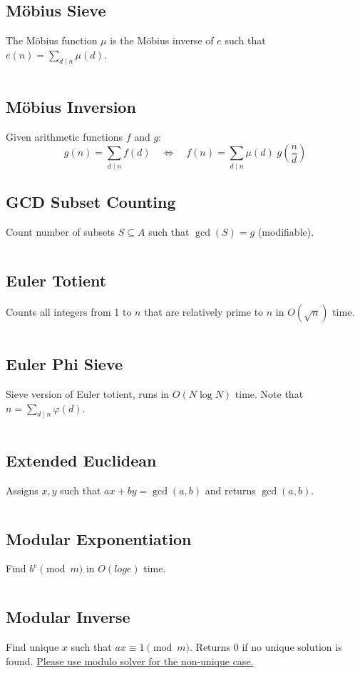\documentclass[8pt,a4paper,landscape,oneside]{amsart}
\newcommand{\code}[1]{\inputminted[fontsize=\normalsize,baselinestretch=1]{cpp}{_code/#1}}
\begin{document}
\begin{multicols*}{3}
  \subsection{M\"{o}bius Sieve}
    The M\"{o}bius function $\mu$ is the M\"{o}bius inverse of $e$ such that $e(n) = \sum_{d\mid n} \mu(d)$.
    \code{numtheory/moebius-sieve.cpp}
  \subsection{M\"{o}bius Inversion}
    Given arithmetic functions $f$ and $g$:
    \[
    g(n) = \sum_{d\mid n} f(d) \quad \Leftrightarrow \quad f(n) = \sum_{d\mid n} \mu(d)\; g\left(\frac{n}{d}\right)
    \]
  \subsection{GCD Subset Counting}
    Count number of subsets $S \subseteq A$ such that $\gcd(S) = g$ (modifiable).
    \code{numtheory/gcd-subsets.cpp}
  \subsection{Euler Totient}
    Counts all integers from 1 to $n$ that are relatively prime to $n$ in $O(\sqrt{n})$ time.
    \code{numtheory/totient.cpp}
  \subsection{Euler Phi Sieve}
    Sieve version of Euler totient, runs in $O(N \log N)$ time. Note that $n = \sum_{d\mid n} \varphi(d)$.
    \code{numtheory/phi-sieve.cpp}
  \subsection{Extended Euclidean}
    Assigns $x,y$ such that $ax + by = \gcd(a,b)$ and returns $\gcd(a,b)$.
    \code{numtheory/extended-euclidean.cpp}
  \subsection{Modular Exponentiation}
    Find $b^e \pmod m$ in $O(log e)$ time.
    \code{numtheory/mod_pow.cpp}
  \subsection{Modular Inverse}
    Find unique $x$ such that $ax \equiv 1 \pmod m$. Returns 0 if no unique solution is found. \underline{Please use modulo solver for the non-unique case.}
    \code{numtheory/modinv.cpp}

\end{multicols*}
\end{document}
